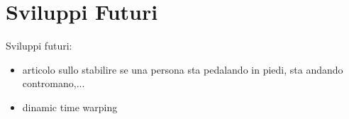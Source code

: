 \documentclass[class=article]{standalone}
\begin{document}
	\section{Sviluppi Futuri}
	Sviluppi futuri:
	\begin{itemize}
		\item articolo sullo stabilire se una persona sta pedalando in piedi, sta andando contromano,...
		\item dinamic time warping
	\end{itemize}	
	
\end{document}
